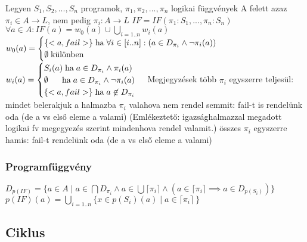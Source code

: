 \documentclass[12pt,a4paper]{article}
\begin{document}
\begin{outline}
	\1 Legyen $S_1,S_2,...,S_n$ programok, $\pi_1,\pi_2,...,\pi_n$ logikai függvények A felett
		\2 azaz $\pi_i \in A \to L$, nem pedig $\pi_i : A \to L$
	\1 $IF=IF(\pi_1:S_1,...,\pi_n:S_n)$
		\2 $\forall a \in A: IF(a) = w_0(a) \cup \bigcup_{i=1..n}w_i(a)$
		\2 $w_0(a)=\begin{cases}
		\{<a,fail>\} \text{\;ha\;} \forall i \in [i..n]: (a \in D_{\pi_i} \wedge \lnot \pi_i(a))\\
		\emptyset \text{\;különben}
		\end{cases}$
		\2 $w_i(a) = \begin{cases}
		S_i(a) \text{\;ha\;} a \in D_{\pi_i} \wedge \pi_i(a)\\
		\emptyset \;\;\;\;\; \text{\;ha\;} a \in D_{\pi_i} \wedge \lnot \pi_i(a)\\
		\{<a,fail>\} \text{\;ha\;} a \not\in D_{\pi_i}\\
		\end{cases}$
	\1 Megjegyzések
		\2 több $\pi_i$ egyszerre teljesül: mindet belerakjuk a halmazba
		\2 $\pi_i$ valahova nem rendel semmit: fail-t is rendelünk oda (de a vs első eleme a valami)
		(Emlékeztető: igazsághalmazzal megadott logikai fv megegyezés szerint mindenhova rendel valamit.)
		\2 összes $\pi_i$ egyszerre hamis: fail-t rendelünk oda (de a vs első eleme a valami)
\end{outline}

\subsubsection{Programfüggvény}

\begin{outline}
	\1 $D_{p(IF)}=\{a\in A \;|\; a \in \bigcap D_{\pi_i} \wedge a \in \bigcup\lceil \pi_i \rceil \wedge (a \in \lceil \pi_i \rceil \implies a \in D_{p(S_i)} )\}$
	\1 $p(IF)(a)=\bigcup_{i=1..n}\{ x \in p(S_i)(a) \; | \; a \in \lceil \pi_i \rceil\ \}$
\end{outline}

\pagebreak

\subsection{Ciklus}
\end{document}
